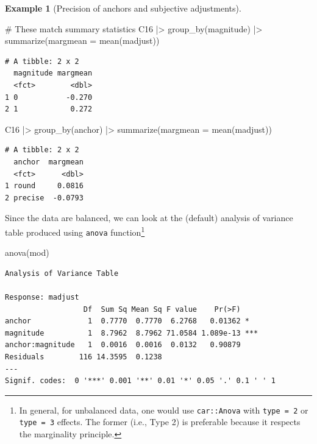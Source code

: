 \documentclass[
  11pt,
  letterpaper,
]{scrbook}
\newenvironment{Shaded}{\begin{snugshade}}{\end{snugshade}}
\newcommand{\AttributeTok}[1]{\textcolor[rgb]{0.40,0.45,0.13}{#1}}
\newcommand{\CommentTok}[1]{\textcolor[rgb]{0.37,0.37,0.37}{#1}}
\newcommand{\FunctionTok}[1]{\textcolor[rgb]{0.28,0.35,0.67}{#1}}
\newcommand{\NormalTok}[1]{\textcolor[rgb]{0.00,0.23,0.31}{#1}}
\newcommand{\SpecialCharTok}[1]{\textcolor[rgb]{0.37,0.37,0.37}{#1}}
\theoremstyle{definition}
\newtheorem{example}{Example}[chapter]
\theoremstyle{definition}
\theoremstyle{remark}
\begin{document}
\begin{example}[Precision of anchors and subjective
adjustments]
\begin{Shaded}
\begin{Highlighting}[]
\CommentTok{\# These match summary statistics}
\NormalTok{C16 }\SpecialCharTok{|\textgreater{}}
  \FunctionTok{group\_by}\NormalTok{(magnitude) }\SpecialCharTok{|\textgreater{}}
  \FunctionTok{summarize}\NormalTok{(}\AttributeTok{margmean =} \FunctionTok{mean}\NormalTok{(madjust))}
\end{Highlighting}
\end{Shaded}

\begin{verbatim}
# A tibble: 2 x 2
  magnitude margmean
  <fct>        <dbl>
1 0           -0.270
2 1            0.272
\end{verbatim}

\begin{Shaded}
\begin{Highlighting}[]
\NormalTok{C16 }\SpecialCharTok{|\textgreater{}}
  \FunctionTok{group\_by}\NormalTok{(anchor) }\SpecialCharTok{|\textgreater{}}
  \FunctionTok{summarize}\NormalTok{(}\AttributeTok{margmean =} \FunctionTok{mean}\NormalTok{(madjust))}
\end{Highlighting}
\end{Shaded}

\begin{verbatim}
# A tibble: 2 x 2
  anchor  margmean
  <fct>      <dbl>
1 round     0.0816
2 precise  -0.0793
\end{verbatim}

Since the data are balanced, we can look at the (default) analysis of
variance table produced using \texttt{anova} function\footnote{In
  general, for unbalanced data, one would use \texttt{car::Anova} with
  \texttt{type\ =\ 2} or \texttt{type\ =\ 3} effects. The former (i.e.,
  Type 2) is preferable because it respects the marginality principle.}

\begin{Shaded}
\begin{Highlighting}[]
\FunctionTok{anova}\NormalTok{(mod)}
\end{Highlighting}
\end{Shaded}

\begin{verbatim}
Analysis of Variance Table

Response: madjust
                  Df  Sum Sq Mean Sq F value    Pr(>F)    
anchor             1  0.7770  0.7770  6.2768   0.01362 *  
magnitude          1  8.7962  8.7962 71.0584 1.089e-13 ***
anchor:magnitude   1  0.0016  0.0016  0.0132   0.90879    
Residuals        116 14.3595  0.1238                      
---
Signif. codes:  0 '***' 0.001 '**' 0.01 '*' 0.05 '.' 0.1 ' ' 1
\end{verbatim}


\end{example}
\end{document}
